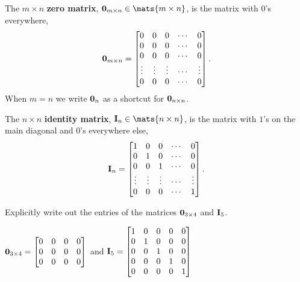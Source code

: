 \begin{df}
The $m\times n$ {\bf zero matrix}, ${\bf 0}_{m\times
n}\in\mats{m\times n}$, is the matrix with $0$'s
everywhere,
$${\bf 0}_{m\times n} = \begin{bmatrix}0 & 0 & 0 & \cdots & 0 \cr 0 & 0 & 0 & \cdots & 0 \cr 0 & 0 & 0
 & \cdots & 0 \cr
\vdots & \vdots & \vdots & \cdots & \vdots \cr 0 & 0
& 0 & \cdots & 0 \cr\end{bmatrix}.$$ When $m = n$ we
write ${\bf 0}_n$ as a shortcut for ${\bf 0}_{n\times
n}$.
\end{df}
\begin{df} 
The $n\times n$ {\bf identity matrix}, 
${\bf I}_n\in\mats{n\times n}$, is the matrix with $1$'s on the  main diagonal and
$0$'s everywhere else,
$${\bf I}_n = \begin{bmatrix}1 & 0 & 0 & \cdots & 0 \cr 0 & 1 & 0 & \cdots & 0 \cr 0 & 0 & 1
& \cdots & 0 \cr \vdots & \vdots & \vdots & \cdots & \vdots
\cr 0 & 0 & 0 & \cdots & 1
\cr\end{bmatrix}.$$
\end{df}

\begin{exer}
Explicitly write out the entries of the matrices 
${\bf 0}_{3\times 4}$ and ${\bf I}_5$.
\vspace*{2in}
\begin{answer}
${\bf 0}_{3\times 4}=
\begin{bmatrix}0 & 0 & 0 & 0 \cr 
0 & 0 & 0 & 0 \cr 
0 & 0 & 0 & 0 \cr \end{bmatrix}$
and 
 ${\bf I}_5=
\begin{bmatrix}
1 & 0 & 0 & 0 & 0\cr 
0 & 1 & 0 & 0 & 0\cr 
0 & 0 & 1 & 0 & 0\cr 
0 & 0 & 0 & 1 & 0\cr 
0 & 0 & 0 & 0 & 1\cr\end{bmatrix}$
\end{answer}
\end{exer}

